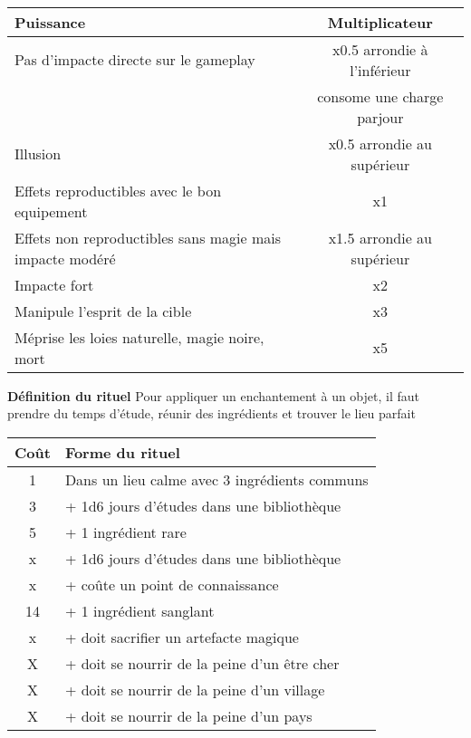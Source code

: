 \documentclass[11pt]{article} %
\newcommand{\myjump}[1][1]{\mbox{}\\[#1cm]}
\begin{document}
\myjump[0.35]\noindent
\begin{tabularx}{\linewidth}{|Xc|}
\hline

    \textbf{Puissance} & \textbf{Multiplicateur}\\
    \hline
    Pas d'impacte directe sur le gameplay & x0.5 arrondie à l'inférieur\\
    & consome une charge parjour\\
    Illusion & x0.5 arrondie au supérieur\\
    Effets reproductibles avec le bon equipement & x1\\
    Effets non reproductibles sans magie mais impacte modéré & x1.5 arrondie au supérieur\\
    Impacte fort & x2\\
    Manipule l'esprit de la cible & x3\\
    Méprise les loies naturelle, magie noire, mort & x5\\


\hline
\end{tabularx}


\newpage
\textbf{\huge Définition du rituel}\newline
Pour appliquer un enchantement à un objet, il faut prendre du temps d'étude, réunir des ingrédients et trouver le lieu parfait

\begin{tabularx}{\linewidth}{|cX|}
\hline

    \textbf{Coût} & \textbf{Forme du rituel}\\
    \hline
    1    & Dans un lieu calme avec 3 ingrédients communs\\
    3 & + 1d6 jours d'études dans une bibliothèque\\
    5 & + 1 ingrédient rare\\
    x & + 1d6 jours d'études dans une bibliothèque\\
    x & + coûte un point de connaissance\\
    14 & + 1 ingrédient sanglant\\
    x & + doit sacrifier un artefacte magique\\
    X & + doit se nourrir de la peine d'un être cher\\
    X & + doit se nourrir de la peine d'un village\\
    X & + doit se nourrir de la peine d'un pays\\

\hline
\end{tabularx}
\end{document}

